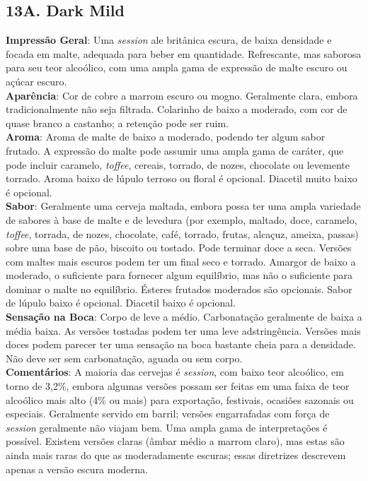 \subsection*{13A. Dark Mild}
\textbf{Impressão Geral}: Uma \textit{session} ale britânica escura, de baixa densidade e focada em malte, adequada para beber em quantidade. Refrescante, mas saborosa para seu teor alcoólico, com uma ampla gama de expressão de malte escuro ou açúcar escuro. \\
\textbf{Aparência}: Cor de cobre a marrom escuro ou mogno. Geralmente clara, embora tradicionalmente não seja filtrada. Colarinho de baixo a moderado, com cor de quase branco a castanho; a retenção pode ser ruim. \\
\textbf{Aroma}: Aroma de malte de baixo a moderado, podendo ter algum sabor frutado. A expressão do malte pode assumir uma ampla gama de caráter, que pode incluir caramelo, \textit{toffee}, cereais, torrado, de nozes, chocolate ou levemente torrado. Aroma baixo de lúpulo terroso ou floral é opcional. Diacetil muito baixo é opcional. \\
\textbf{Sabor}: Geralmente uma cerveja maltada, embora possa ter uma ampla variedade de sabores à base de malte e de levedura (por exemplo, maltado, doce, caramelo, \textit{toffee}, torrada, de nozes, chocolate, café, torrado, frutas, alcaçuz, ameixa, passas) sobre uma base de pão, biscoito ou tostado. Pode terminar doce a seca. Versões com maltes mais escuros podem ter um final seco e torrado. Amargor de baixo a moderado, o suficiente para fornecer algum equilíbrio, mas não o suficiente para dominar o malte no equilíbrio. Ésteres frutados moderados são opcionais. Sabor de lúpulo baixo é opcional. Diacetil baixo é opcional. \\
\textbf{Sensação na Boca}: Corpo de leve a médio. Carbonatação geralmente de baixa a média baixa. As versões tostadas podem ter uma leve adstringência. Versões mais doces podem parecer ter uma sensação na boca bastante cheia para a densidade. Não deve ser sem carbonatação, aguada ou sem corpo. \\
\textbf{Comentários}: A maioria das cervejas é \textit{session}, com baixo teor alcoólico, em torno de 3,2\%, embora algumas versões possam ser feitas em uma faixa de teor alcoólico mais alto (4\% ou mais) para exportação, festivais, ocasiões sazonais ou especiais. Geralmente servido em barril; versões engarrafadas com força de \textit{session} geralmente não viajam bem. Uma ampla gama de interpretações é possível. Existem versões claras (âmbar médio a marrom claro), mas estas são ainda mais raras do que as moderadamente escuras; essas diretrizes descrevem apenas a versão escura moderna. \\
